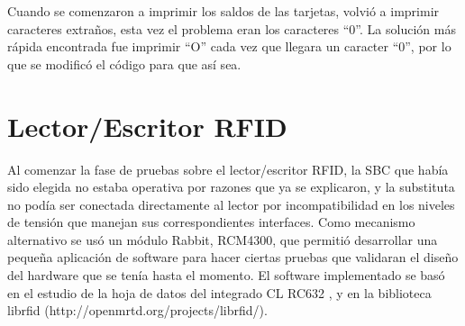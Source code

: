 Cuando se comenzaron a imprimir los saldos de las tarjetas, volvió a imprimir caracteres extraños, esta vez el problema eran los caracteres “0”. La solución más rápida encontrada fue imprimir “O” cada vez que llegara un caracter “0”, por lo que se modificó el código para que así sea.


\section{Lector/Escritor RFID}
Al comenzar la fase de pruebas sobre el lector/escritor RFID, la SBC que había sido elegida no estaba operativa por razones que ya se explicaron, y la substituta no podía ser conectada directamente al lector por incompatibilidad en los niveles de tensión que manejan sus correspondientes interfaces. Como mecanismo alternativo se usó un módulo Rabbit, RCM4300, que permitió desarrollar una pequeña aplicación de software para hacer ciertas pruebas que validaran el diseño del hardware que se tenía hasta el momento. El software implementado se basó en el estudio de la hoja de datos del integrado CL RC632 , y en la biblioteca librfid (http://openmrtd.org/projects/librfid/). 


